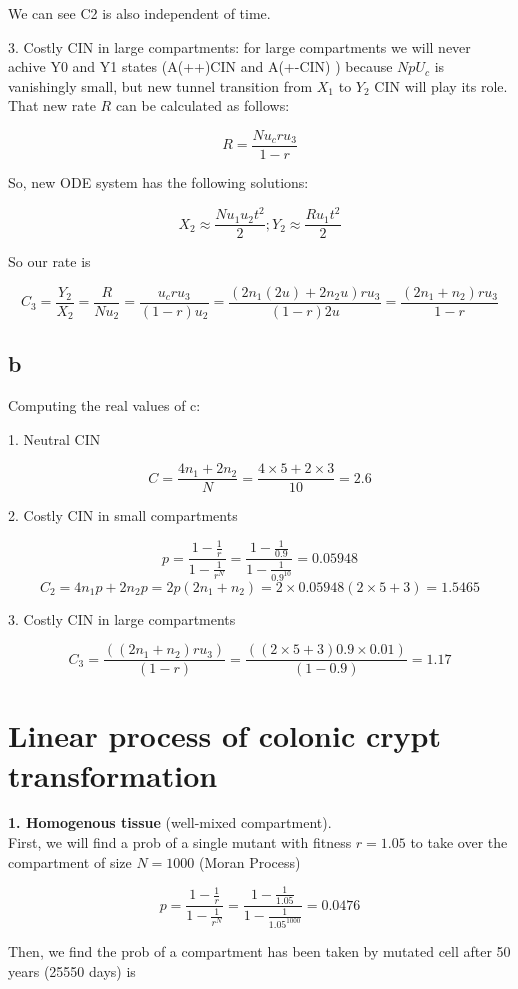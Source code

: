 We can see C2 is also independent of time.

3.	Costly CIN in large compartments: for large compartments we will never achive Y0 and Y1 states (A(++)CIN  and A(+-CIN) )  because $N p U_c$ is vanishingly small, but new tunnel transition from $X_1$ to $Y_2$ CIN will play its role. That new rate $R$ can be calculated as follows:

\[ R = \frac{Nu_cru_3}{1-r} \]

So, new ODE system has the following solutions:

\[ X_2 \approx \frac{Nu_1u_2t^2}{2} ; Y_2 \approx \frac{Ru_1t^2}{2} \]

So our rate is

\[ C_3 = \frac{Y_2}{X_2} = \frac{R}{Nu_2} = \frac{u_cru_3}{(1-r)u_2} = \frac{(2n_1(2u)+2n_2u)ru_3}{(1-r)2u} = \frac{(2n_1+n_2)ru_3}{1-r}\]

\subsection{b}
Computing the real values of c:

1. Neutral CIN

\[ C = \frac{4n_1+2n_2}{N} = \frac{4\times 5+2 \times 3}{10} = \boxed{2.6} \]

2. Costly CIN in small compartments

\[ p = \frac{1-\frac{1}{r}}{1 - \frac{1}{r^N}} = \frac{1-\frac{1}{0.9}}{1-\frac{1}{0.9^{10}}} = 0.05948  \]
\[ C_2 = 4n_1p+2n_2p = 2p(2n_1+n_2 )=2\times0.05948(2\times5+3)=\boxed{1.5465} \]

3. Costly CIN in large compartments

\[ C_3=\frac{((2n_1+n_2)ru_3)}{(1-r)}=\frac{((2\times5+3)0.9\times0.01)}{(1-0.9)}=\boxed{1.17} \]


\setcounter{chapter}{2}
\setcounter{section}{0}
\section{Linear process of colonic crypt transformation}

\textbf{1. Homogenous tissue} (well-mixed compartment).\\
First, we will find a prob of a single mutant with fitness $r=1.05$ to take over the compartment of size $N=1000$ (Moran Process)

\[ p = \frac{1-\frac{1}{r}}{1 - \frac{1}{r^N}} = \frac{1-\frac{1}{1.05}}{1-\frac{1}{1.05^{1000}}} = 0.0476  \]

Then, we find the prob of a compartment has been taken by mutated cell after 50 years (25550 days) is 

